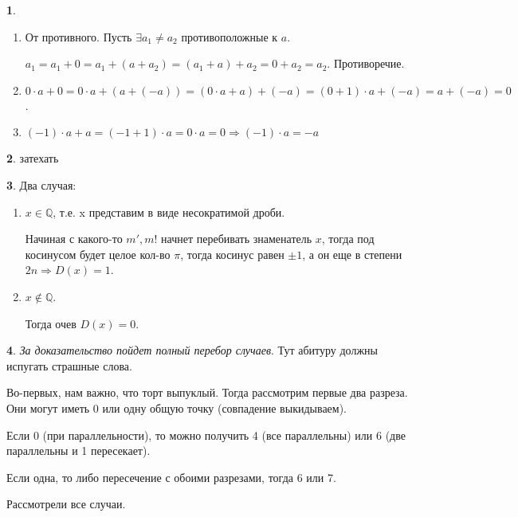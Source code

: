 \documentclass[14pt, a4paper]{extarticle}
\theoremstyle{definition}
\newtheorem{problem}{}
\theoremstyle{definition}
\theoremstyle{remark}
\numberwithin{equation}{section}
\newcommand{\Q}{\ensuremath{\mathbb{Q}}}
\begin{document}
\begin{problem}
    \renewcommand{\labelenumi}{\alph{enumi})}
    \begin{enumerate}
        \item От противного. Пусть $\exists a_1 \neq a_2$ противоположные к $a$.
        
        $a_1 = a_1 + 0 = a_1 + (a + a_2) = (a_1 + a) + a_2 = 0 + a_2 = a_2$.
        Противоречие.
        
        \item $0 \cdot a + 0 = 0 \cdot a + (a + (-a)) = (0 \cdot a + a) + (-a) = 
        (0 + 1) \cdot a + (-a) = a + (-a) = 0$.
        
        \item $(-1) \cdot a + a = (-1 + 1) \cdot a = 0 \cdot a = 0 \Rightarrow (-1) \cdot a = -a$
    \end{enumerate}
\end{problem}

\begin{problem}
    затехать
\end{problem}

\begin{problem}
    Два случая:
    \renewcommand{\labelenumi}{\alph{enumi})}
    \begin{enumerate}
        \item $x \in \Q$, т.е. x представим в виде несократимой дроби. 
        
        Начиная с какого-то $m', m!$ начнет перебивать знаменатель $x$, 
        тогда под косинусом будет целое кол-во $\pi$, тогда косинус равен
        $\pm 1$, а он еще в степени $2n \Rightarrow D(x) = 1$.

        \item $x \not\in \Q$.
        
        Тогда очев $D(x) = 0$.
    \end{enumerate}
\end{problem}

\begin{problem}
    \textit{За доказательство пойдет полный перебор случаев}.
    Тут абитуру должны испугать страшные слова.

    Во-первых, нам важно, что торт выпуклый. Тогда рассмотрим первые два разреза.
    Они могут иметь 0 или одну общую точку (совпадение выкидываем).

    Если 0 (при параллельности), то можно получить 4 (все параллельны)
    или 6 (две параллельны и 1 пересекает). 
    
    Если одна, то либо пересечение с обоими разрезами, 
    тогда 6 или 7.

    Рассмотрели все случаи.
\end{problem}
\end{document}
